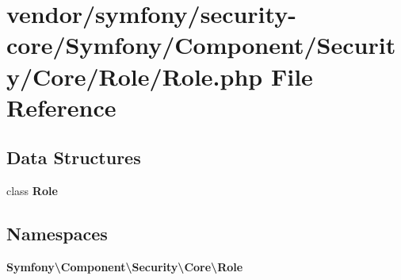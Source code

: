\section{vendor/symfony/security-\/core/\+Symfony/\+Component/\+Security/\+Core/\+Role/\+Role.php File Reference}
\label{_role_8php}
\subsection*{Data Structures}
\begin{DoxyCompactItemize}
\item 
class {\bf Role}
\end{DoxyCompactItemize}
\subsection*{Namespaces}
\begin{DoxyCompactItemize}
\item 
 {\bf Symfony\textbackslash{}\+Component\textbackslash{}\+Security\textbackslash{}\+Core\textbackslash{}\+Role}
\end{DoxyCompactItemize}
